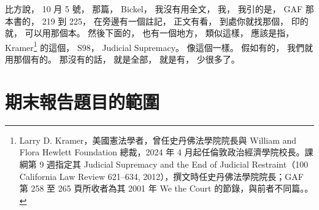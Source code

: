 \hypertarget{w01:cue:764}{}比方說，
\hypertarget{w01:cue:765}{}10 月 5 號，
\hypertarget{w01:cue:766}{}那篇，
\hypertarget{w01:cue:767}{}Bickel，
\hypertarget{w01:cue:768}{}我沒有用全文，
\hypertarget{w01:cue:769}{}我，
\hypertarget{w01:cue:770}{}我引的是，
\hypertarget{w01:cue:771}{}GAF 那本書的，
\hypertarget{w01:cue:772}{}219 到 225，
\hypertarget{w01:cue:773}{}在旁邊有一個註記，
\hypertarget{w01:cue:774}{}正文有看，
\hypertarget{w01:cue:775}{}到處你就找那個，
\hypertarget{w01:cue:776}{}印的就，
\hypertarget{w01:cue:777}{}可以用那個本。
\hypertarget{w01:cue:778}{}然後下面的，
\hypertarget{w01:cue:779}{}也有一個地方，
\hypertarget{w01:cue:780}{}類似這樣，
\hypertarget{w01:cue:781}{}應該是指，
\hypertarget{w01:cue:782}{}Kramer\footnote{Larry D. Kramer，美國憲法學者，曾任史丹佛法學院院長與 William and Flora Hewlett Foundation 總裁，2024 年 4 月起任倫敦政治經濟學院校長。課綱第 9 週指定其 Judicial Supremacy and the End of Judicial Restraint（100 California Law Review 621–634, 2012），撰文時任史丹佛法學院院長；GAF 第 258 至 265 頁所收者為其 2001 年 We the Court 的節錄，與前者不同篇。\cite{kramer2001gaf}。} 的這個，
\hypertarget{w01:cue:783}{}S98，
\hypertarget{w01:cue:784}{}Judicial Supremacy。
\hypertarget{w01:cue:785}{}像這個一樣。
\hypertarget{w01:cue:786}{}假如有的，
\hypertarget{w01:cue:787}{}我們就用那個有的。
\hypertarget{w01:cue:788}{}那沒有的話，
\hypertarget{w01:cue:789}{}就是全部，
\hypertarget{w01:cue:790}{}就是有，
\hypertarget{w01:cue:791}{}少很多了。

\section{期末報告題目的範圍}

